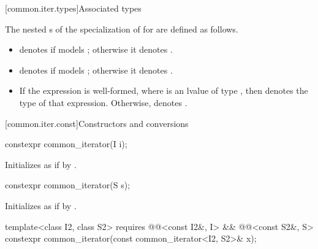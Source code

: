 [common.iter.types]{Associated types}

\pnum
The nested s of the specialization of
 for  are defined as follows.
\begin{itemize}
\item
{} denotes 
if  models ;
otherwise it denotes .

\item
{} denotes
if 
models ;
otherwise it denotes .

\item
If the expression  is well-formed,
where  is an lvalue of type ,
then  denotes the type of that expression.
Otherwise,  denotes .
\end{itemize}

[common.iter.const]{Constructors and conversions}

%
\begin{itemdecl}
constexpr common_iterator(I i);
\end{itemdecl}

\begin{itemdescr}
\pnum
\effects
Initializes  as if by .
\end{itemdescr}

%
\begin{itemdecl}
constexpr common_iterator(S s);
\end{itemdecl}

\begin{itemdescr}
\pnum
\effects
Initializes  as if by
.
\end{itemdescr}

%
\begin{itemdecl}
template<class I2, class S2>
  requires @@<const I2&, I> && @@<const S2&, S>
    constexpr common_iterator(const common_iterator<I2, S2>& x);
\end{itemdecl}

